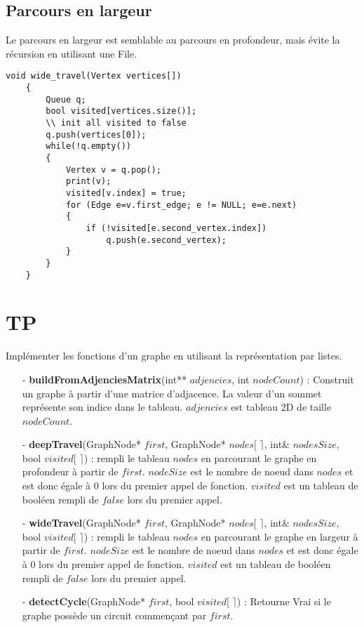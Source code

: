 \documentclass[11pt]{extarticle}
\begin{document}
\subsection{Parcours en largeur}
Le parcours en largeur est semblable au parcours en profondeur, mais évite la récursion en utilisant une File.
\begin{center}
\begin{lstlisting}[style=customc, escapechar=@]
	void wide_travel(Vertex vertices[])
	{
		Queue q;
		bool visited[vertices.size()];
		\\ init all visited to false
		q.push(vertices[0]);
		while(!q.empty())
		{
			Vertex v = q.pop();
			print(v);
			visited[v.index] = true;
			for (Edge e=v.first_edge; e != NULL; e=e.next)
			{
				if (!visited[e.second_vertex.index])
					q.push(e.second_vertex);
			}
		}
	}
\end{lstlisting}
\end{center}
\section{TP}
\noindent
Implémenter les fonctions d'un graphe en utilisant la représentation par listes.
\begin{itemize}
\item[ - \textbf{buildFromAdjenciesMatrix}(int** $adjencies$, int $nodeCount$)]: Construit un graphe à partir d'une matrice d'adjacence. La valeur d'un sommet représente son indice dans le tableau. $adjencies$ est tableau 2D de taille $nodeCount$.
\item[ - \textbf{deepTravel}(GraphNode* $first$, GraphNode* $nodes$[ $\rceil$, int\& $nodesSize$, bool $visited$[ $\rceil$)]: rempli le tableau $nodes$ en parcourant le graphe en profondeur à partir de $first$. $nodeSize$ est le nombre de noeud dans $nodes$ et est donc égale à 0 lors du premier appel de fonction. $visited$ est un tableau de booléen rempli de $false$ lors du premier appel. 
\item[ - \textbf{wideTravel}(GraphNode* $first$, GraphNode* $nodes$[ $\rceil$, int\& $nodesSize$, bool $visited$[ $\rceil$)]: rempli le tableau $nodes$ en parcourant le graphe en largeur à partir de $first$. $nodeSize$ est le nombre de noeud dans $nodes$ et est donc égale à 0 lors du premier appel de fonction. $visited$ est un tableau de booléen rempli de $false$ lors du premier appel. 
\item[ - \textbf{detectCycle}(GraphNode* $first$, bool $visited$[ $\rceil$)]: Retourne Vrai si le graphe possède un circuit commençant par $first$.
\end{itemize}
\end{document}
